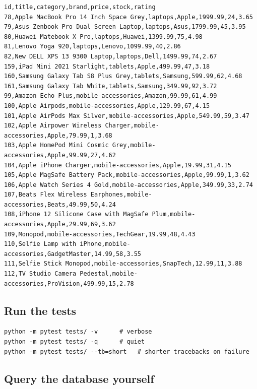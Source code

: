 \begin{codebox}
\noindent
\begin{lstlisting}[style=txt]
id,title,category,brand,price,stock,rating
78,Apple MacBook Pro 14 Inch Space Grey,laptops,Apple,1999.99,24,3.65
79,Asus Zenbook Pro Dual Screen Laptop,laptops,Asus,1799.99,45,3.95
80,Huawei Matebook X Pro,laptops,Huawei,1399.99,75,4.98
81,Lenovo Yoga 920,laptops,Lenovo,1099.99,40,2.86
82,New DELL XPS 13 9300 Laptop,laptops,Dell,1499.99,74,2.67
159,iPad Mini 2021 Starlight,tablets,Apple,499.99,47,3.18
160,Samsung Galaxy Tab S8 Plus Grey,tablets,Samsung,599.99,62,4.68
161,Samsung Galaxy Tab White,tablets,Samsung,349.99,92,3.72
99,Amazon Echo Plus,mobile-accessories,Amazon,99.99,61,4.99
100,Apple Airpods,mobile-accessories,Apple,129.99,67,4.15
101,Apple AirPods Max Silver,mobile-accessories,Apple,549.99,59,3.47
102,Apple Airpower Wireless Charger,mobile-accessories,Apple,79.99,1,3.68
103,Apple HomePod Mini Cosmic Grey,mobile-accessories,Apple,99.99,27,4.62
104,Apple iPhone Charger,mobile-accessories,Apple,19.99,31,4.15
105,Apple MagSafe Battery Pack,mobile-accessories,Apple,99.99,1,3.62
106,Apple Watch Series 4 Gold,mobile-accessories,Apple,349.99,33,2.74
107,Beats Flex Wireless Earphones,mobile-accessories,Beats,49.99,50,4.24
108,iPhone 12 Silicone Case with MagSafe Plum,mobile-accessories,Apple,29.99,69,3.62
109,Monopod,mobile-accessories,TechGear,19.99,48,4.43
110,Selfie Lamp with iPhone,mobile-accessories,GadgetMaster,14.99,58,3.55
111,Selfie Stick Monopod,mobile-accessories,SnapTech,12.99,11,3.88
112,TV Studio Camera Pedestal,mobile-accessories,ProVision,499.99,15,2.78
\end{lstlisting}
\end{codebox}

\subsection{Run the tests}

\begin{codebox}
\noindent
\begin{lstlisting}[style=sh]
python -m pytest tests/ -v      # verbose
python -m pytest tests/ -q      # quiet
python -m pytest tests/ --tb=short   # shorter tracebacks on failure
\end{lstlisting}
\end{codebox}

\subsection{Query the database yourself}
\label{sec:manual-queries}

